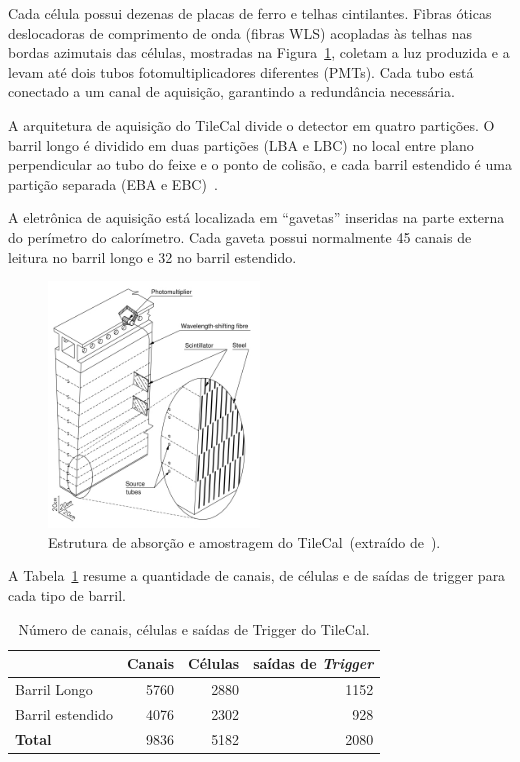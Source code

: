 Cada célula possui dezenas de placas de ferro e telhas cintilantes. Fibras
óticas deslocadoras de comprimento de onda  (fibras WLS) acopladas às telhas nas
bordas azimutais das células, mostradas na Figura~\ref{fig:tilecalslice},
coletam a luz produzida e a levam até dois tubos fotomultiplicadores
diferentes (PMTs). Cada tubo está conectado a um canal de aquisição, garantindo a
redundância necessária.


A arquitetura de aquisição do TileCal divide o detector em quatro partições. O
barril longo é dividido em duas partições (LBA e LBC) no local entre  plano
perpendicular ao tubo do feixe e o ponto de colisão, e cada barril estendido é
uma partição separada (EBA e EBC)~\cite{AAD2010READINESS}.

A eletrônica de aquisição está localizada em ``gavetas'' inseridas na parte
externa do perímetro do calorímetro. Cada gaveta possui normalmente 45
canais de leitura no barril longo e 32 no barril estendido.

\begin{figure}[htpb!]
    \centering
    \includegraphics[width=0.5\textwidth]{images/tile_slice.jpg}
    \caption[Estrutura de absorção e amostragem do TileCal]{Estrutura de
    absorção e amostragem do TileCal~(extraído de~\cite{ATLAS2008}).}

    \label{fig:tilecalslice}
\end{figure}

A Tabela~\ref{table:tilefacts} resume a quantidade de canais, de células e de
saídas de trigger para cada tipo de barril.


\begin{table}[htbp!]
  \centering
  \begin{tabular}{ l  r  r  r  }
      \toprule
                         & Canais & Células & saídas de \emph{Trigger}\\
      \midrule
        Barril Longo     & 5760 & 2880 & 1152 \\
        Barril estendido & 4076 & 2302 &  928 \\ [2ex]
        {\bfseries Total}            & 9836 & 5182 & 2080 \\
      \bottomrule
  \end{tabular}
  \caption{Número de canais, células e saídas de Trigger do TileCal.}
  \label{table:tilefacts}
\end{table}

